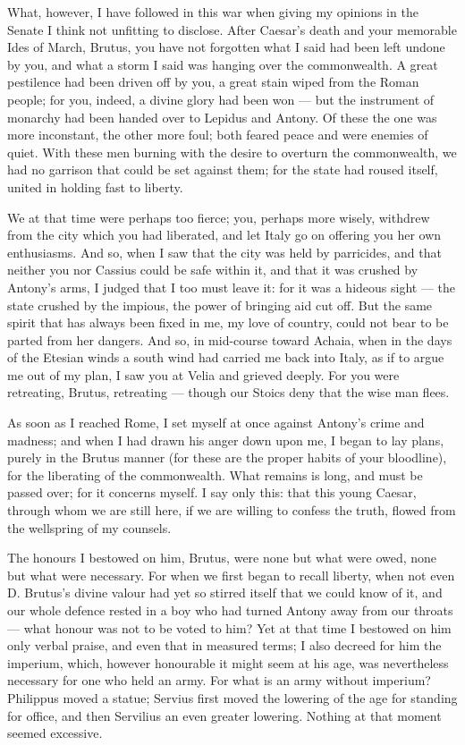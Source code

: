  What, however, I have followed in this war when giving my opinions in the Senate I think not unfitting to disclose. After Caesar's death and your memorable Ides of March, Brutus, you have not forgotten what I said had been left undone by you, and what a storm I said was hanging over the commonwealth. A great pestilence had been driven off by you, a great stain wiped from the Roman people; for you, indeed, a divine glory had been won --- but the instrument of monarchy had been handed over to Lepidus and Antony. Of these the one was more inconstant, the other more foul; both feared peace and were enemies of quiet. With these men burning with the desire to overturn the commonwealth, we had no garrison that could be set against them; for the state had roused itself, united in holding fast to liberty.

 We at that time were perhaps too fierce; you, perhaps more wisely, withdrew from the city which you had liberated, and let Italy go on offering you her own enthusiasms. And so, when I saw that the city was held by parricides, and that neither you nor Cassius could be safe within it, and that it was crushed by Antony's arms, I judged that I too must leave it: for it was a hideous sight --- the state crushed by the impious, the power of bringing aid cut off. But the same spirit that has always been fixed in me, my love of country, could not bear to be parted from her dangers. And so, in mid-course toward Achaia, when in the days of the Etesian winds a south wind had carried me back into Italy, as if to argue me out of my plan, I saw you at Velia and grieved deeply. For you were retreating, Brutus, retreating --- though our Stoics deny that the wise man flees.

 As soon as I reached Rome, I set myself at once against Antony's crime and madness; and when I had drawn his anger down upon me, I began to lay plans, purely in the Brutus manner (for these are the proper habits of your bloodline), for the liberating of the commonwealth. What remains is long, and must be passed over; for it concerns myself. I say only this: that this young Caesar, through whom we are still here, if we are willing to confess the truth, flowed from the wellspring of my counsels.

 The honours I bestowed on him, Brutus, were none but what were owed, none but what were necessary. For when we first began to recall liberty, when not even D. Brutus's divine valour had yet so stirred itself that we could know of it, and our whole defence rested in a boy who had turned Antony away from our throats --- what honour was not to be voted to him? Yet at that time I bestowed on him only verbal praise, and even that in measured terms; I also decreed for him the imperium, which, however honourable it might seem at his age, was nevertheless necessary for one who held an army. For what is an army without imperium? Philippus moved a statue; Servius first moved the lowering of the age for standing for office, and then Servilius an even greater lowering. Nothing at that moment seemed excessive.

